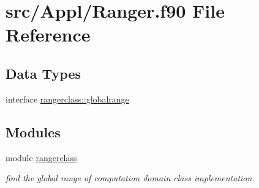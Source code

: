 \hypertarget{_ranger_8f90}{}\section{src/\+Appl/\+Ranger.f90 File Reference}
\label{_ranger_8f90}
\subsection*{Data Types}
\begin{DoxyCompactItemize}
\item 
interface \mbox{\hyperlink{interfacerangerclass_1_1globalrange}{rangerclass\+::globalrange}}
\end{DoxyCompactItemize}
\subsection*{Modules}
\begin{DoxyCompactItemize}
\item 
module \mbox{\hyperlink{namespacerangerclass}{rangerclass}}
\begin{DoxyCompactList}\small\item\em find the global range of computation domain class implementation. \end{DoxyCompactList}\end{DoxyCompactItemize}
